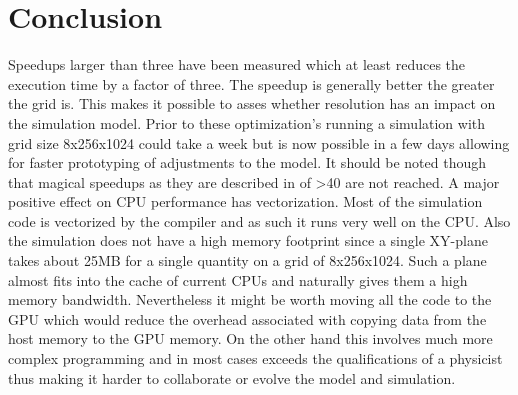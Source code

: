 \documentclass[master.tex]{subfiles}
\begin{document}
\section{Conclusion}
Speedups larger than three have been measured which at least reduces the execution time by a factor of three. The speedup is generally better the greater the grid is. This makes it possible to asses whether resolution has an impact on the simulation model. Prior to these optimization's running a simulation with grid size 8x256x1024 could take a week but is now possible in a few days allowing for faster prototyping of adjustments to the model. It should be noted though that magical speedups as they are described in \cite{CUDARedBlack} of >40 are not reached. A major positive effect on CPU performance has vectorization. Most of the simulation code is vectorized by the compiler and as such it runs very well on the CPU. Also the simulation does not have a high memory footprint since a single XY-plane takes about 25MB for a single quantity on a grid of 8x256x1024. Such a plane almost fits into the cache of current CPUs and naturally gives them a high memory bandwidth. Nevertheless it might be worth moving all the code to the GPU which would reduce the overhead associated with copying data from the host memory to the GPU memory. On the other hand this involves much more complex programming and in most cases exceeds the qualifications of a physicist thus making it harder to collaborate or evolve the model and simulation.
\end{document}
